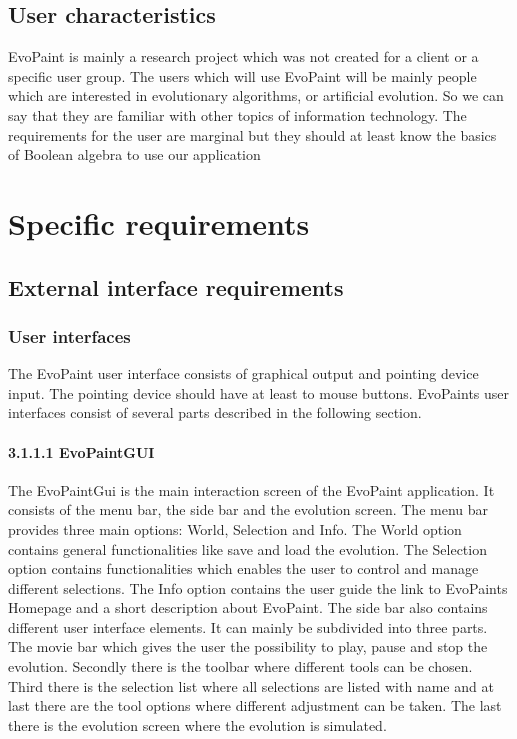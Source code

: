 \documentclass[titlepage,12pt]{scrartcl}
\begin{document}
\subsection{User characteristics}
EvoPaint is mainly a research project which was not created for a client or a specific user group. The users which will use EvoPaint will be mainly people which are interested in evolutionary algorithms, or artificial evolution. So we can say that they are familiar with other topics of information technology. The requirements for the user are marginal but they should at least know the basics of Boolean algebra to use our application

\section{Specific requirements}
\subsection{External interface requirements}
\subsubsection{User interfaces}
The EvoPaint user interface consists of graphical output and pointing device input. The pointing device should have at least to mouse buttons. EvoPaints user interfaces consist of several parts described in the following section.

\paragraph{3.1.1.1	EvoPaintGUI}
The EvoPaintGui is the main interaction screen of the EvoPaint application. It consists of the menu bar, the side bar and the evolution screen. The menu bar provides three main options: World, Selection and Info. 
The World option contains general functionalities like save and load the evolution. The Selection option contains functionalities which enables the user to control and manage different selections. The Info option contains the user guide the link to EvoPaints Homepage and a short description about EvoPaint.
The side bar also contains different user interface elements. It can mainly be subdivided into three parts. The movie bar which gives the user the possibility to play, pause and stop the evolution. Secondly there is the toolbar where different tools can be chosen. Third there is the selection list where all selections are listed with name and at last there are the tool options where different adjustment can be taken.
The last there is the evolution screen where the evolution is simulated.
\end{document}
